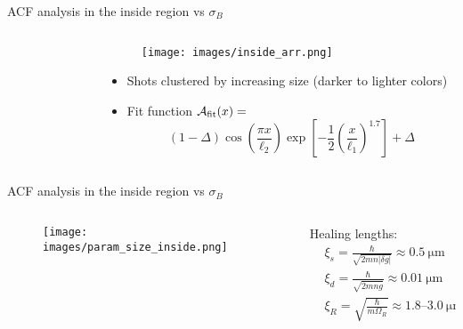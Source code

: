 \documentclass[aspectratio=169]{beamer}
\begin{document}
\begin{frame}{ACF analysis in the inside region vs $\sigma_B$}
  \begin{columns}
    \begin{column}{0.50\textwidth}
      \begin{figure}
        \centering
      \end{figure}
    \end{column}
    \begin{column}{0.50\textwidth}
      \begin{figure}
        \centering
        \texttt{[image: images/inside\_arr.png]}
      \end{figure}
      \begin{itemize}
        \item Shots clustered by increasing size (darker to lighter colors)
        \item Fit function $\mathcal{A}_{\rm fit}(x) = $
        \begin{equation*}
          (1 - \Delta)\cos(\frac{\pi x}{\ell_2})\exp[-\frac{1}{2}\left(\frac{x}{\ell_1}\right)^{1.7}] + \Delta
        \end{equation*}
      \end{itemize}
    \end{column}
  \end{columns}
\end{frame}

\begin{frame}{ACF analysis in the inside region vs $\sigma_B$}
  \begin{columns}
    \begin{column}{0.7\textwidth}
      \begin{figure}
        \centering
        \texttt{[image: images/param\_size\_inside.png]}
      \end{figure}
    \end{column}
    \begin{column}{0.3\textwidth}
      Healing lengths:
      \begin{align*}
        &\xi_s = \frac{\hbar}{\sqrt{2mn|\delta g|}} \approx 0.5\ \unit{\micro\meter}\\
        &\xi_d = \frac{\hbar}{\sqrt{2mn\overline{g}}} \approx 0.01\ \unit{\micro\meter}\\
        &\xi_R = \sqrt{\frac{\hbar}{m\Omega_R}} \approx \numrange[range-phrase=-]{1.8}{3.0}\ \unit{\micro\meter}
      \end{align*}
    \end{column}
  \end{columns}
\end{frame}
\end{document}
